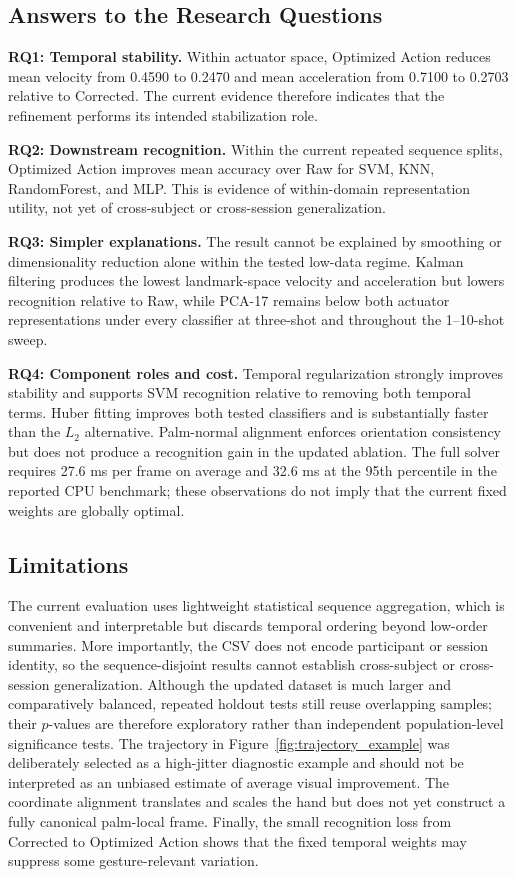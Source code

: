 \documentclass[11pt]{article}
\begin{document}
\subsection{Answers to the Research Questions}
\textbf{RQ1: Temporal stability.} Within actuator space, Optimized Action reduces mean velocity from 0.4590 to 0.2470 and mean acceleration from 0.7100 to 0.2703 relative to Corrected. The current evidence therefore indicates that the refinement performs its intended stabilization role.

\textbf{RQ2: Downstream recognition.} Within the current repeated sequence splits, Optimized Action improves mean accuracy over Raw for SVM, KNN, RandomForest, and MLP. This is evidence of within-domain representation utility, not yet of cross-subject or cross-session generalization.

\textbf{RQ3: Simpler explanations.} The result cannot be explained by smoothing or dimensionality reduction alone within the tested low-data regime. Kalman filtering produces the lowest landmark-space velocity and acceleration but lowers recognition relative to Raw, while PCA-17 remains below both actuator representations under every classifier at three-shot and throughout the 1--10-shot sweep.

\textbf{RQ4: Component roles and cost.} Temporal regularization strongly improves stability and supports SVM recognition relative to removing both temporal terms. Huber fitting improves both tested classifiers and is substantially faster than the $L_2$ alternative. Palm-normal alignment enforces orientation consistency but does not produce a recognition gain in the updated ablation. The full solver requires 27.6 ms per frame on average and 32.6 ms at the 95th percentile in the reported CPU benchmark; these observations do not imply that the current fixed weights are globally optimal.

\subsection{Limitations}
The current evaluation uses lightweight statistical sequence aggregation, which is convenient and interpretable but discards temporal ordering beyond low-order summaries. More importantly, the CSV does not encode participant or session identity, so the sequence-disjoint results cannot establish cross-subject or cross-session generalization. Although the updated dataset is much larger and comparatively balanced, repeated holdout tests still reuse overlapping samples; their $p$-values are therefore exploratory rather than independent population-level significance tests. The trajectory in Figure~\ref{fig:trajectory_example} was deliberately selected as a high-jitter diagnostic example and should not be interpreted as an unbiased estimate of average visual improvement. The coordinate alignment translates and scales the hand but does not yet construct a fully canonical palm-local frame. Finally, the small recognition loss from Corrected to Optimized Action shows that the fixed temporal weights may suppress some gesture-relevant variation.
\end{document}
